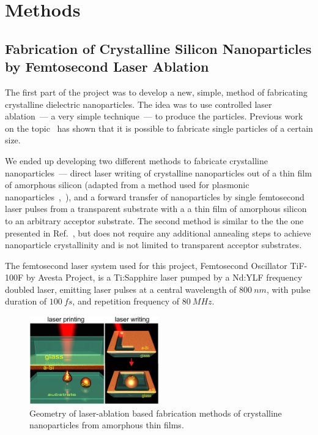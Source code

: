 \section{Methods}
\label{ch:Exp}

    \subsection{Fabrication of Crystalline Silicon Nanoparticles by Femtosecond Laser Ablation}
    \label{sec:Ablation}
            The first part of the project was to develop a new, simple, method of fabricating crystalline dielectric
        nanoparticles. The idea was to use controlled laser ablation~--- a very simple technique~--- to produce the particles.
        Previous work on the topic~\cite{kuznetsov2012magnetic, zywietz2014laser} has shown that it is possible to fabricate single particles
        of a certain size.

            We ended up developing two different methods to fabricate crystalline nanoparticles~--- direct laser writing of crystalline
        nanoparticles out of a thin film of amorphous silicon (adapted from a method used for plasmonic nanoparticles~\cite{makarov2016controllable},~), and a forward transfer of nanoparticles by single femtosecond laser pulses
        from a transparent substrate with a a thin film of amorphous silicon to an arbitrary acceptor substrate. The second method is
        similar to the the one presented in Ref.~\cite{zywietz2014laser}, but does not require any additional annealing steps to achieve
        nanoparticle crystallinity and is not limited to transparent acceptor substrates.

            The femtosecond laser system used for this project, Femtosecond Oscillator TiF-100F by Avesta Project, is a Ti:Sapphire laser pumped
        by a Nd:YLF frequency doubled laser, emitting laser pulses at a central wavelength of $800~\si{nm}$, with pulse duration of $100~\si{fs}$,
        and repetition frequency of $80~\si{MHz}$.

        \begin{figure}[h!]
                \begin{center}
                    \includegraphics[width=0.5\textwidth]{figs/methods/LaserPrinting.eps}
                \end{center}
                \caption{Geometry of laser-ablation based fabrication methods of crystalline nanoparticles from amorphous
                            thin films.}
                \label{fig:LaserPrinting}
        \end{figure}

